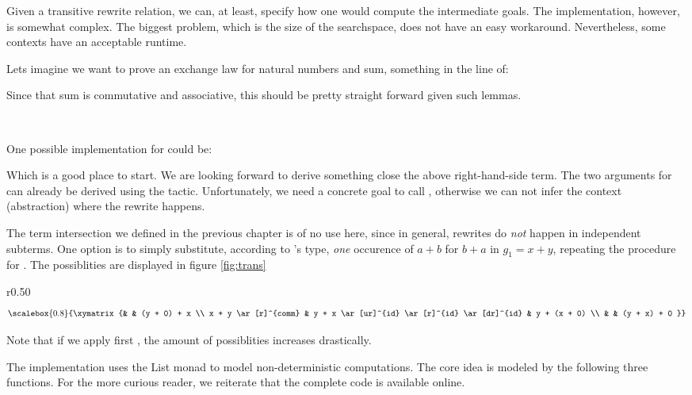 Given a transitive rewrite relation, we can, at least, specify how one would
compute the intermediate goals. The implementation, however, is somewhat complex. 
The biggest problem, which is the size of the searchspace,
does not have an easy workaround. Nevertheless, some contexts have an acceptable runtime. 

Lets imagine we want to prove an exchange law for natural numbers and sum, something
in the line of:


Since that sum is commutative and associative, this should be pretty straight forward
given such lemmas.

\\

One possible implementation for  could be:


Which is a good place to start. We are looking forward to derive something close the above
right-hand-side term. The two arguments for  can already be derived using the 
tactic. Unfortunately, we need a concrete goal to call , otherwise we can not infer the
context (abstraction) where the rewrite happens.

The term intersection we defined in the previous chapter is of no use here, since in general,
rewrites do \emph{not} happen in independent subterms. One option is to simply substitute, according
to 's type, \emph{one} occurence of $a + b$ for $b + a$ in $g_1 = x + y$, repeating
the procedure for . The possiblities are displayed in figure \ref{fig:trans}

\begin{wrapfigure}{r}{0.50\textwidth}
\begin{displaymath}
\scalebox{0.8}{%
\xymatrix{%
  & & (y + 0) + x \\
x + y \ar[r]^{comm} & y + x \ar[ur]^{id} \ar[r]^{id} \ar[dr]^{id} & y + (x + 0) \\
& & (y + x) + 0
}}
\end{displaymath}
\caption{Substitution outcomes}
\label{fig:trans}
\end{wrapfigure}

Note that if we apply first , the amount of possiblities increases drastically.

The implementation uses the List monad to model non-deterministic computations. The core idea
is modeled by the following three functions. For the more curious reader, we reiterate that
the complete code is available online.


